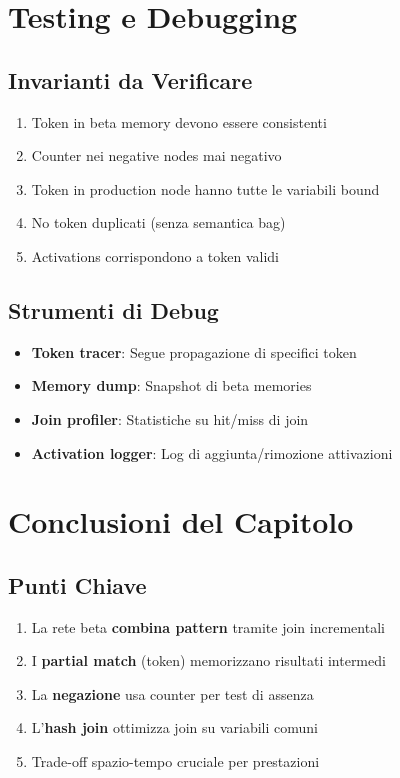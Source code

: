 \section{Testing e Debugging}

\subsection{Invarianti da Verificare}

\begin{enumerate}
\item Token in beta memory devono essere consistenti
\item Counter nei negative nodes mai negativo
\item Token in production node hanno tutte le variabili bound
\item No token duplicati (senza semantica bag)
\item Activations corrispondono a token validi
\end{enumerate}

\subsection{Strumenti di Debug}

\begin{itemize}
\item \textbf{Token tracer}: Segue propagazione di specifici token
\item \textbf{Memory dump}: Snapshot di beta memories
\item \textbf{Join profiler}: Statistiche su hit/miss di join
\item \textbf{Activation logger}: Log di aggiunta/rimozione attivazioni
\end{itemize}

\section{Conclusioni del Capitolo}

\subsection{Punti Chiave}

\begin{enumerate}
\item La rete beta \textbf{combina pattern} tramite join incrementali
\item I \textbf{partial match} (token) memorizzano risultati intermedi
\item La \textbf{negazione} usa counter per test di assenza
\item L'\textbf{hash join} ottimizza join su variabili comuni
\item Trade-off spazio-tempo cruciale per prestazioni
\end{enumerate}

